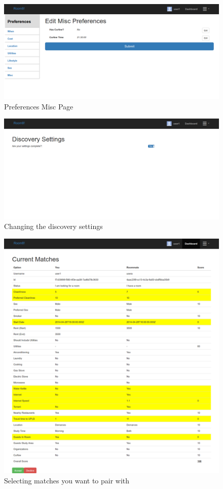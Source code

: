 \documentclass[journal]{IEEEtran}
\begin{document}
    \begin{figure}
        \centering
            \includegraphics[scale=0.17]{prefmisc.png}
            \caption{Preferences Misc Page}
            \label{Preferences Misc Page}
    \end{figure}
    \begin{figure}
        \centering
            \includegraphics[scale=0.17]{discovery.png}
            \caption{Changing the discovery settings}
            \label{Discovery Settings}
    \end{figure}
    \begin{figure}
        \centering
            \includegraphics[scale=0.17]{matches.png}
            \caption{Selecting matches you want to pair with}
            \label{Selecting Matches}
    \end{figure}
\end{document}
